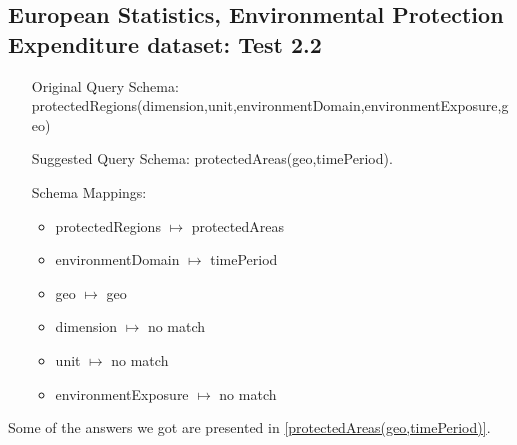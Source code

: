 \documentclass[a4paper,10pt]{article}
\begin{document}
\subsection{European Statistics, Environmental Protection Expenditure dataset: Test 2.2}
\label{EU Protected Areas 2.2}


\begin{itemize}
\item[Original Query Schema:] protectedRegions(dimension,unit,environmentDomain,environmentExposure,geo)

\item[Suggested Query Schema: ]
protectedAreas(geo,timePeriod).


\item[Schema Mappings:] 
		\begin{itemize}
		\item protectedRegions $\mapsto$ protectedAreas
\item environmentDomain $\mapsto$ timePeriod
\item geo $\mapsto$ geo
\item dimension $\mapsto$ no match
\item unit $\mapsto$ no match
\item environmentExposure $\mapsto$ no match
\end{itemize}

		\end{itemize}
		
		
	Some of the answers we got are presented in  \ref{protectedAreas(geo,timePeriod)}.
\end{document}
